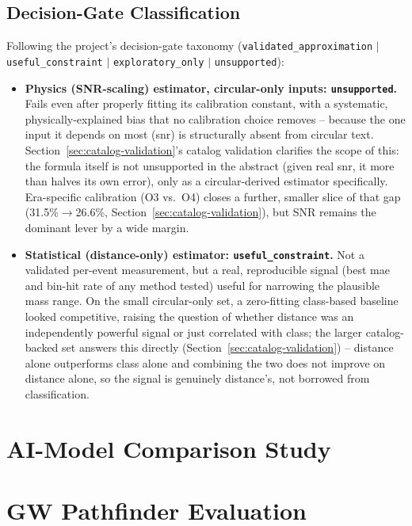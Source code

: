 \subsection{Decision-Gate Classification}

Following the project's decision-gate taxonomy (\texttt{validated\_approximation} $\mid$ \texttt{useful\_constraint} $\mid$ \texttt{exploratory\_only} $\mid$ \texttt{unsupported}):

\begin{itemize}
    \item \textbf{Physics (SNR-scaling) estimator, circular-only inputs: \texttt{unsupported}.} Fails even after properly fitting its calibration constant, with a systematic, physically-explained bias that no calibration choice removes -- because the one input it depends on most (\gls{snr}) is structurally absent from circular text. Section~\ref{sec:catalog-validation}'s catalog validation clarifies the scope of this: the formula itself is not unsupported in the abstract (given real \gls{snr}, it more than halves its own error), only as a circular-derived estimator specifically. Era-specific calibration (O3 vs.\ O4) closes a further, smaller slice of that gap (31.5\%$\to$26.6\%, Section~\ref{sec:catalog-validation}), but SNR remains the dominant lever by a wide margin.
    \item \textbf{Statistical (distance-only) estimator: \texttt{useful\_constraint}.} Not a validated per-event measurement, but a real, reproducible signal (best \gls{mae} and bin-hit rate of any method tested) useful for narrowing the plausible mass range. On the small circular-only set, a zero-fitting class-based baseline looked competitive, raising the question of whether distance was an independently powerful signal or just correlated with class; the larger catalog-backed set answers this directly (Section~\ref{sec:catalog-validation}) -- distance alone outperforms class alone and combining the two does not improve on distance alone, so the signal is genuinely distance's, not borrowed from classification.
\end{itemize}

\section{AI-Model Comparison Study}


\section{GW Pathfinder Evaluation}

